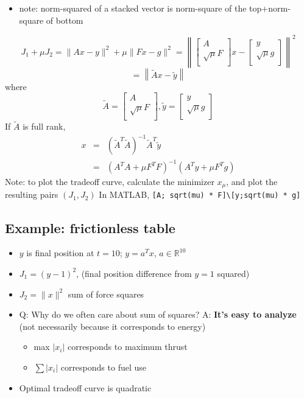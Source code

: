 \documentclass[10pt,letterpaper]{article}
\begin{document}
\begin{itemize}
\item note: norm-squared of a stacked vector is norm-square of the top+norm-square of bottom
\end{itemize}
$$J_1+\mu J_2 = \| Ax - y \| ^{2} + \mu \| Fx - g \| ^{2} = \left\|
\begin{bmatrix}
  A           \\
  \sqrt \mu F \\
\end{bmatrix}
x-
\begin{bmatrix}
  y \\
  \sqrt \mu g \\
\end{bmatrix}
\right\| ^{2} 
$$
\[
= \left\| \tilde Ax- \tilde y \right\|
\]
where
\[
\tilde A =
\begin{bmatrix}
  A           \\
  \sqrt \mu F \\
\end{bmatrix}
, \tilde y =
\begin{bmatrix}
  y \\
  \sqrt \mu g \\
\end{bmatrix}
\]
If $\tilde A$ is full rank,
\begin{eqnarray}
x &=& \left( \tilde A ^{T} \tilde A \right)^{-1} \tilde A ^{T} \tilde y \\
  &=& ( A ^{T} A + \mu F ^{T} F) ^{-1} (A ^{T} y + \mu F ^{T} g)
\end{eqnarray}
Note: to plot the tradeoff curve, calculate the minimizer $x_\mu$, and plot the resulting pairs $(J_1, J_2)$ 
In MATLAB, \texttt{[A; sqrt(mu) * F]\textbackslash{}[y;sqrt(mu) * g]}
\subsection{Example: frictionless table}
\label{sec-6_3}

\begin{itemize}
\item $y$ is final position at $t=10$; $y=a ^{T} x$, $a\in \mathbb{R}^{10}$
\item $J_1 = (y-1) ^{2}$, (final position difference from $y=1$ squared)
\item $J_2 = \|x\| ^{2}$ sum of force squares
\item Q: Why do we often care about sum of squares? A: \textbf{It's easy to analyze} (not necessarily because it corresponds to energy)

\begin{itemize}
\item max $| x_i |$ corresponds to maximum thrust
\item $\sum |x_i|$ corresponds to fuel use
\end{itemize}

\item Optimal tradeoff curve is quadratic
\end{itemize}
\end{document}

